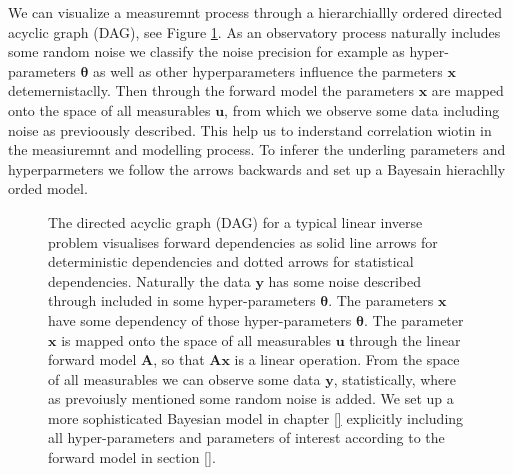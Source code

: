 We can visualize a measuremnt process through a hierarchiallly ordered directed acyclic graph (DAG), see Figure \ref{fig:FirstDAG}.
As an observatory process naturally includes some random noise we classify the noise precision for example as hyper-parameters $\bm{\theta}$ as well as other hyperparameters influence the parmeters $\bm{x}$ detemernistaclly.
Then through the forward model the parameters $\bm{x}$ are mapped onto the space of all measurables $\bm{u}$, from which we observe some data including noise as previoously described.
This help us to inderstand correlation wiotin in the measiuremnt and modelling process.
To inferer the underling parameters and hyperparmeters we follow the arrows backwards and set up a Bayesain hierachlly orded model.


\begin{figure}[ht!]
	\centering
	\caption[Bayesian Inference DAG]{The directed acyclic graph (DAG) for a typical linear inverse problem visualises forward dependencies as solid line arrows for deterministic dependencies and dotted arrows for statistical dependencies.
	Naturally the data $\bm{y}$ has some noise described through included in some hyper-parameters $\bm{\theta}$.
	The parameters $\bm{x}$ have some dependency of those hyper-parameters $\bm{\theta}$. The parameter $\bm{x}$ is mapped onto the space of all measurables $\bm{u}$ through the linear forward model $\bm{A}$, so that $\bm{Ax}$ is a linear operation.
	From the space of all measurables we can observe some data $\bm{y}$, statistically, where as prevoiusly mentioned some random noise is added.
	We set up a more sophisticated Bayesian model in chapter \ref{} explicitly including all hyper-parameters and parameters of interest according to the forward model in section \ref{}.}
	\label{fig:FirstDAG}
\end{figure}

